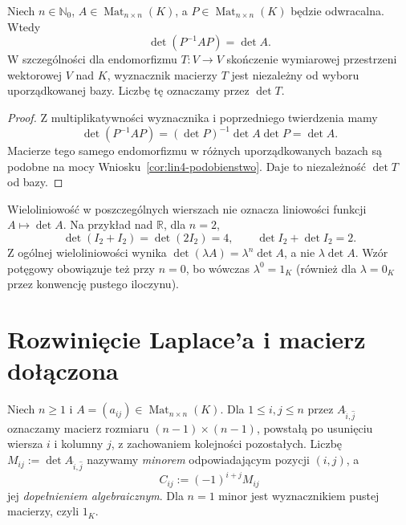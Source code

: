 \begin{wniosek}
\label{cor:lin6-podobienstwo}
Niech \(n\in\mathbb N_0\),
\(A\in\operatorname{Mat}_{n\times n}(K)\),
a \(P\in\operatorname{Mat}_{n\times n}(K)\)
będzie odwracalna. Wtedy
\[
 \det(P^{-1}AP)=\det A.
\]
W szczególności dla endomorfizmu
\(T\colon V\to V\) skończenie wymiarowej
przestrzeni wektorowej \(V\) nad \(K\),
wyznacznik macierzy \(T\) jest
niezależny od wyboru uporządkowanej bazy.
Liczbę tę oznaczamy przez \(\det T\).
\end{wniosek}
\begin{proof}
Z multiplikatywności wyznacznika
i poprzedniego twierdzenia mamy
\[
 \det(P^{-1}AP)
 =(\det P)^{-1}\det A\det P
 =\det A.
\]
Macierze tego samego endomorfizmu
w różnych uporządkowanych bazach
są podobne na mocy
Wniosku~\ref{cor:lin4-podobienstwo}.
Daje to niezależność \(\det T\) od bazy.
\end{proof}

\begin{uwaga}
\label{rem:lin6-nieliniowosc}
Wieloliniowość w poszczególnych wierszach
nie oznacza liniowości funkcji
\(A\mapsto\det A\). Na przykład nad
\(\mathbb R\), dla \(n=2\),
\[
 \det(I_2+I_2)=\det(2I_2)=4,
 \qquad \det I_2+\det I_2=2.
\]
Z ogólnej wieloliniowości wynika
\(\det(\lambda A)=\lambda^n\det A\),
a nie \(\lambda\det A\).
Wzór potęgowy obowiązuje też przy \(n=0\),
bo wówczas \(\lambda^0=1_K\)
(również dla \(\lambda=0_K\) przez
konwencję pustego iloczynu).
\end{uwaga}

\section{Rozwinięcie Laplace'a i macierz dołączona}
\label{sec:lin6-laplace}

\begin{definicja}
\label{def:lin6-minor}
Niech \(n\geq1\) i
\(A=(a_{ij})\in\operatorname{Mat}_{n\times n}(K)\).
Dla \(1\leq i,j\leq n\) przez
\(A_{\widehat i,\widehat j}\)
oznaczamy macierz rozmiaru
\((n-1)\times(n-1)\), powstałą po
usunięciu wiersza \(i\) i kolumny \(j\),
z zachowaniem kolejności pozostałych.
Liczbę
\(M_{ij}:=\det A_{\widehat i,\widehat j}\)
nazywamy \emph{minorem} odpowiadającym
pozycji \((i,j)\), a
\[
 C_{ij}:=(-1)^{i+j}M_{ij}
\]
jej \emph{dopełnieniem algebraicznym}.
Dla \(n=1\) minor jest wyznacznikiem
pustej macierzy, czyli \(1_K\).
\end{definicja}


